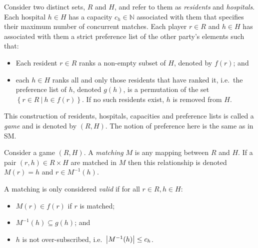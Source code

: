 \begin{definition}\label{def:hr_game}
    Consider two distinct sets, \(R\) and \(H\), and refer to them as
    \emph{residents} and \emph{hospitals}. Each hospital \(h \in H\) has a
    capacity \(c_h \in \mathbb{N}\) associated with them that specifies their
    maximum number of concurrent matches. Each player \(r \in R\) and \(h \in
    H\) has associated with them a strict preference list of the other party's
    elements such that:
    
    \begin{itemize}
        \item Each resident \(r \in R\) ranks a non-empty subset of \(H\),
            denoted by \(f(r)\); and
        \item each \(h \in H\) ranks all and only those residents that have
            ranked it, i.e.\ the preference list of \(h\), denoted \(g(h)\), is
            a permutation of the set
            \(\left\{r \in R \ | \ h \in f(r)\right\}\). If no such residents
            exist, \(h\) is removed from \(H\).
    \end{itemize}
    
    This construction of residents, hospitals, capacities and preference lists
    is called a \emph{game} and is denoted by \((R, H)\). The notion of
    preference here is the same as in SM.
\end{definition}

\begin{definition}\label{def:hr_matching}
    Consider a game \((R, H)\). A \emph{matching} \(M\) is any mapping between
    \(R\) and \(H\). If a pair \((r, h) \in R \times H\) are matched in \(M\)
    then this relationship is denoted \(M(r) = h\) and \(r \in M^{-1}(h)\).

    A matching is only considered \emph{valid} if for all \(r \in R, h \in H\):

    \begin{itemize}
        \item \(M(r) \in f(r)\) if \(r\) is matched;
        \item \(M^{-1}(h) \subseteq g(h)\); and
        \item \(h\) is not over-subscribed, i.e.\ \(\abs*{M^{-1}(h)} \leq c_h\).
    \end{itemize}
\end{definition}

